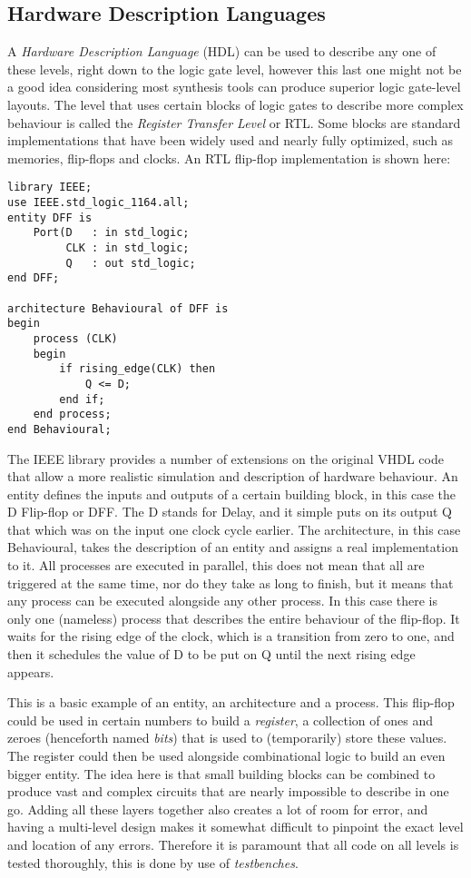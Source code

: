 \documentclass[11pt,british]{article}
\begin{document}
\subsection{Hardware Description Languages}

A \emph{Hardware Description Language} (HDL) can be used to describe
any one of these levels, right down to the logic gate level, however
this last one might not be a good idea considering most synthesis
tools can produce superior logic gate-level layouts\cite{key-1}.
The level that uses certain blocks of logic gates to describe more
complex behaviour is called the \emph{Register Transfer Level} or
RTL. Some blocks are standard implementations that have been widely
used and nearly fully optimized, such as memories, flip-flops and
clocks. An RTL flip-flop implementation is shown here: 

\begin{lstlisting}[tabsize=4, frame=single]
library IEEE;
use IEEE.std_logic_1164.all;
entity DFF is
	Port(D 	 : in std_logic;
		 CLK : in std_logic;
		 Q 	 : out std_logic;
end DFF;

architecture Behavioural of DFF is
begin
	process (CLK)
	begin
		if rising_edge(CLK) then
			Q <= D;
		end if;
	end process;
end Behavioural;
\end{lstlisting}

The IEEE library provides a number of extensions on the original VHDL
code that allow a more realistic simulation and description of hardware
behaviour. An entity defines the inputs and outputs of a certain building
block, in this case the D Flip-flop or DFF. The D stands for Delay,
and it simple puts on its output Q that which was on the input one
clock cycle earlier. The architecture, in this case Behavioural, takes
the description of an entity and assigns a real implementation to
it. All processes are executed in parallel, this does not mean that
all are triggered at the same time, nor do they take as long to finish,
but it means that any process can be executed alongside any other
process. In this case there is only one (nameless) process that describes
the entire behaviour of the flip-flop. It waits for the rising edge
of the clock, which is a transition from zero to one, and then it
schedules the value of D to be put on Q until the next rising edge
appears.

This is a basic example of an entity, an architecture and a process.
This flip-flop could be used in certain numbers to build a \emph{register},
a collection of ones and zeroes (henceforth named \emph{bits}) that
is used to (temporarily) store these values. The register could then
be used alongside combinational logic to build an even bigger entity.
The idea here is that small building blocks can be combined to produce
vast and complex circuits that are nearly impossible to describe in
one go. Adding all these layers together also creates a lot of room
for error, and having a multi-level design makes it somewhat difficult
to pinpoint the exact level and location of any errors. Therefore
it is paramount that all code on all levels is tested thoroughly,
this is done by use of \emph{testbenches}.\cite{key-2}
\end{document}
